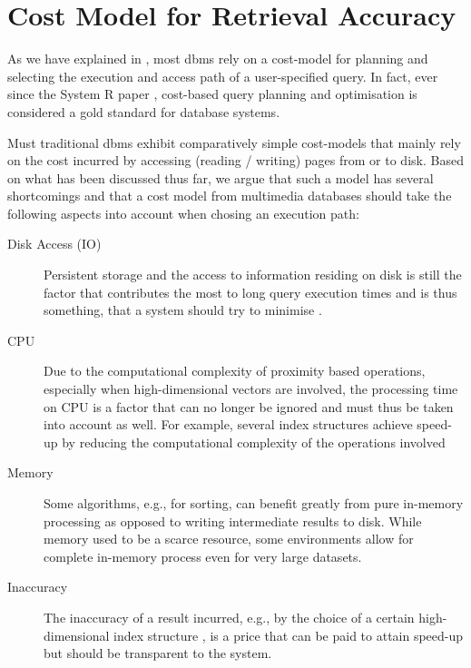 \pagebreak

\section{Cost Model for Retrieval Accuracy}
\label{section:cost_model}


As we have explained in , most \acrshort{dbms} rely on a cost-model for planning and selecting the execution and access path of a user-specified query. In fact, ever since the System R paper \cite{Selinger:1979Access}, cost-based query planning and optimisation is considered a gold standard for database systems.

Must traditional \acrshort{dbms} exhibit comparatively simple cost-models that mainly rely on the cost incurred by accessing (reading / writing) pages from or to disk. Based on what has been discussed thus far, we argue that such a model has several shortcomings and that a cost model from multimedia databases should take the following aspects into account when chosing an execution path:

\begin{description}
    \item[Disk Access (IO)] Persistent storage and the access to information residing on disk is still the factor that contributes the most to long query execution times and is thus something, that a system should try to minimise \cite{Selinger:1979Access}.
    \item[CPU] Due to the computational complexity of proximity based operations, especially when high-dimensional vectors are involved, the processing time on CPU is a factor that can no longer be ignored and must thus be taken into account as well. For example, several index structures achieve speed-up by reducing the computational complexity of the operations involved \cite{Weber:1998Va,Jegou:2010Product}
    \item[Memory] Some algorithms, e.g., for sorting, can benefit greatly from pure in-memory processing as opposed to writing intermediate results to disk. While memory used to be a scarce resource, some environments allow for complete in-memory process even for very large datasets.
    \item[Inaccuracy] The inaccuracy of a result incurred, e.g., by the choice of a certain high-dimensional index structure \cite{Indyk1998:Approximate,Jegou:2010Product}, is a price that can be paid to attain speed-up but should be transparent to the system.
\end{description}

